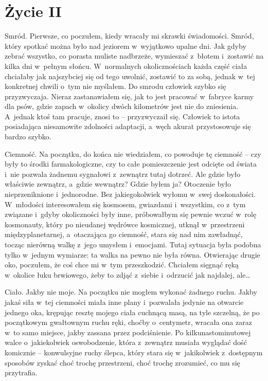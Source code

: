 \chapter{Życie II}

Smród. Pierwsze, co poczułem, kiedy wracały mi skrawki świadomości. Smród, który spotkać można było nad jeziorem w~wyjątkowo upalne dni. Jak gdyby zebrać wszystko, co porasta muliste nadbrzeże, wymieszać z~błotem i~zostawić na kilka dni w~pełnym słońcu. W~normalnych okolicznościach każda część ciała chciałaby jak najszybciej się od tego uwolnić, zostawić to za sobą, jednak w~tej konkretnej chwili o~tym nie myślałem. Do smrodu człowiek szybko się przyzwyczaja. Nieraz zastanawiałem się, jak to jest pracować w~fabryce karmy dla psów, gdzie zapach w~okolicy dwóch kilometrów jest nie do zniesienia. A~jednak ktoś tam pracuje, znosi to -- przyzwyczaił się. Człowiek to istota posiadająca niesamowite zdolności adaptacji, a~węch akurat przystosowuje się bardzo szybko. 

Ciemność. Na początku, do końca nie wiedziałem, co powoduje tę ciemność -- czy były to środki farmakologiczne, czy to całe pomieszczenie jest odcięte od świata i~nie pozwala żadnemu sygnałowi z~zewnątrz tutaj dotrzeć. Ale gdzie było właściwie zewnątrz, a~gdzie wewnątrz? Gdzie byłem ja? Otoczenie było nieprzeniknione i~jednorodne. Bez jakiegokolwiek wyłomu w~swej doskonałości. W~młodości interesowałem się kosmosem, gwiazdami i~wszystkim, co z~tym związane i~gdyby okoliczności były inne, próbowałbym się pewnie wczuć w~rolę kosmonauty, który po nieudanej wędrówce kosmicznej, utknął w~przestrzeni międzyplanetarnej, a~otaczająca go ciemność, stara się nad nim zawładnąć, tocząc nierówną walkę z~jego umysłem i~emocjami. Tutaj sytuacja była podobna tylko w~jednym wymiarze: ta walka na pewno nie była równa. Otwierając drugie oko, poczułem, że coś chce mi w~tym przeszkodzić. Chciałem sięgnąć ręką w~okolice łuku brwiowego, żeby to zdjąć z~siebie i~odrzucić jak najdalej, ale… 

Ciało. Jakby nie moje. Na początku nie mogłem wykonać żadnego ruchu. Jakby jakaś siła w~tej ciemności miała inne plany i~pozwalała jedynie na otwarcie jednego oka, krępując resztę mojego ciała cuchnącą masą, na tyle szczelną, że po początkowym gwałtownym ruchu ręki, choćby o~centymetr, wracała ona zaraz w~to samo miejsce, jakby zassana przez podciśnienie. Po kilkunastominutowej walce o~jakiekolwiek oswobodzenie, która z~zewnątrz musiała wyglądać dość komicznie -- konwulsyjne ruchy ślepca, który stara się w~jakikolwiek z~dostępnym sposobów zyskać choć trochę przestrzeni, choć trochę zrozumieć, co mu się przytrafia. 

